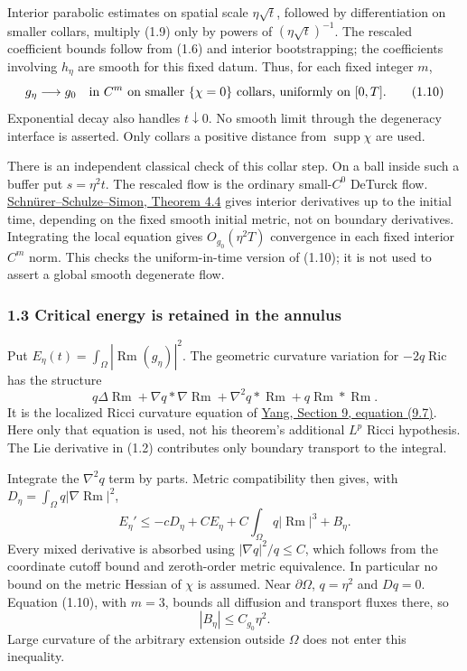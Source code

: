 \documentclass[
  11pt,
]{article}
\begin{document}
Interior parabolic estimates on spatial scale \(\eta\sqrt t\), followed
by differentiation on smaller collars, multiply (1.9) only by powers of
\((\eta\sqrt t)^{-1}\). The rescaled coefficient bounds follow from
(1.6) and interior bootstrapping; the coefficients involving \(h_\eta\)
are smooth for this fixed datum. Thus, for each fixed integer \(m\), \[
 g_\eta\longrightarrow g_0\quad\hbox{in }C^m
 \text{ on smaller }\{\chi=0\}\text{ collars, uniformly on }[0,T].
                                                               \tag{1.10}
\] Exponential decay also handles \(t\downarrow0\). No smooth limit
through the degeneracy interface is asserted. Only collars a positive
distance from \(\operatorname{supp}\chi\) are used.

There is an independent classical check of this collar step. On a ball
inside such a buffer put \(s=\eta^2t\). The rescaled flow is the
ordinary small-\(C^0\) DeTurck flow.
\href{https://arxiv.org/pdf/0706.0421}{Schnürer--Schulze--Simon, Theorem
4.4} gives interior derivatives up to the initial time, depending on the
fixed smooth initial metric, not on boundary derivatives. Integrating
the local equation gives \(O_{g_0}(\eta^2T)\) convergence in each fixed
interior \(C^m\) norm. This checks the uniform-in-time version of
(1.10); it is not used to assert a global smooth degenerate flow.

\hypertarget{critical-energy-is-retained-in-the-annulus}{%
\subsubsection{1.3 Critical energy is retained in the
annulus}\label{critical-energy-is-retained-in-the-annulus}}

Put \(E_\eta(t)=\int_\Omega|\operatorname{Rm}(g_\eta)|^2\). The
geometric curvature variation for \(-2q\operatorname{Ric}\) has the
structure \[
 q\Delta\operatorname{Rm}
 +\nabla q*\nabla\operatorname{Rm}
 +\nabla^2q*\operatorname{Rm}
 +q\operatorname{Rm}*\operatorname{Rm}.
\] It is the localized Ricci curvature equation of
\href{https://www.numdam.org/item/10.24033/asens.1644.pdf}{Yang, Section
9, equation (9.7)}. Here only that equation is used, not his theorem's
additional \(L^p\) Ricci hypothesis. The Lie derivative in (1.2)
contributes only boundary transport to the integral.

Integrate the \(\nabla^2q\) term by parts. Metric compatibility then
gives, with \(D_\eta=\int_\Omega q|\nabla\operatorname{Rm}|^2\), \[
 E_\eta'\le-cD_\eta+CE_\eta+
          C\int_\Omega q|\operatorname{Rm}|^3+B_\eta. \tag{1.11}
\] Every mixed derivative is absorbed using \(|\nabla q|^2/q\le C\),
which follows from the coordinate cutoff bound and zeroth-order metric
equivalence. In particular no bound on the metric Hessian of \(\chi\) is
assumed. Near \(\partial\Omega\), \(q=\eta^2\) and \(Dq=0\). Equation
(1.10), with \(m=3\), bounds all diffusion and transport fluxes there,
so \[
                         |B_\eta|\le C_{g_0}\eta^2.   \tag{1.12}
\] Large curvature of the arbitrary extension outside \(\Omega\) does
not enter this inequality.
\end{document}
